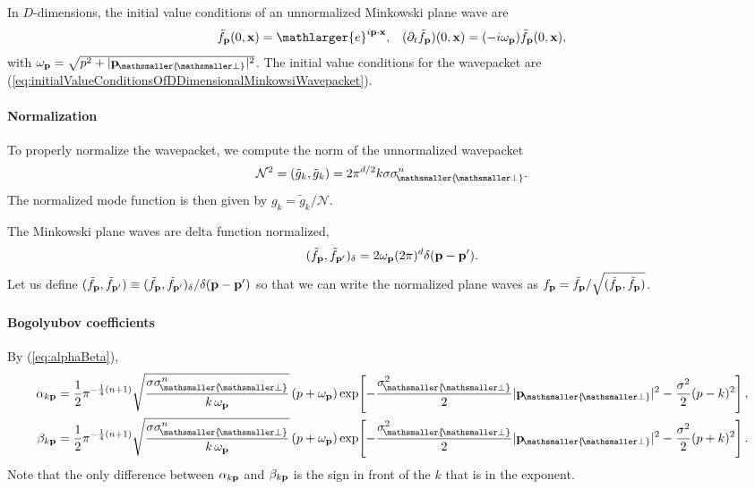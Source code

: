 \documentclass[11pt, a4paper]{article}
\def\bx{{\bf x}}
\def\bp{{\bf p}}
\newcommand{\om}{\omega}
\newcommand{\be}{\beta}
\newcommand{\al}{\alpha}
\newcommand{\si}{{\sigma}}
\newcommand{\mc}[1]{\mathcal{#1}}
\let\perptmp\perp
\renewcommand{\perp}{{\! \mathsmaller{\perptmp}}}
\newcommand{\e}{\mathlarger{e}}
\begin{document}
In $D$-dimensions, the initial value conditions of an unnormalized Minkowski plane wave are 
\begin{align*}
	\tilde f_\bp(0,\bx)=\e^{i \bp\cdot\bx},&&(\partial_t \tilde f_\bp)(0,\bx)=(-i\om_\bp)\tilde f_\bp(0,\bx),
\end{align*}
with $\om_\bp=\sqrt{p ^2+|\bp_\perp|^2}$. The initial value conditions for the wavepacket are (\ref{eq:initialValueConditionsOfDDimensionalMinkowsiWavepacket}).

\paragraph{Normalization}
To properly normalize the wavepacket, we compute the norm of the unnormalized wavepacket 
\begin{align*}
\mc N^2=(\tilde g_k,\tilde g_k)=2\pi^{d/2} k \si \si_\perp^n.
\end{align*}
The normalized mode function is then given by $g_k=\tilde g_k/
	\mc N$.

The Minkowski plane waves are delta function normalized, 
\begin{align*}
	(\tilde f_\bp,\tilde f_{\bp'})_\delta=2\om_\bp(2\pi)^{d}\delta(\bp-\bp'). 
\end{align*}
Let us define $(\tilde f_\bp,\tilde f_{\bp'})\equiv(\tilde f_\bp,\tilde f_{\bp'})_\delta/\delta(\bp-\bp')$ so that we can write the normalized plane waves as $f_\bp=\tilde f_\bp/\sqrt{(\tilde f_\bp,\tilde f_\bp)}$. 


\paragraph{Bogolyubov coefficients}
By (\ref{eq:alphaBeta}),
\begin{align*}
	\al_{k\bp}&=\frac{1}{2}\pi^{-\frac{1}{4}(n+1)}\sqrt{\frac{\si \si_\perp^n}{ k \,\om_\bp}}\,(p +\om_\bp)\exp\!\left[-\frac{\si_\perp^2}{2}|\bp_\perp|^2-\frac{\si ^2}{2}(p - k )^2\right],\\
	\be_{k\bp}&=\frac{1}{2}\pi^{-\frac{1}{4}(n+1)}\sqrt{\frac{\si \si_\perp^n}{ k \,\om_\bp}}\,(p +\om_\bp)\exp\!\left[-\frac{\si_\perp^2}{2}|\bp_\perp|^2-\frac{\si ^2}{2}(p + k )^2\right].
\end{align*}
Note that the only difference between $\al_{k\bp}$ and $\be_{k\bp}$ is the sign in front of the $ k $ that is in the exponent.
\end{document}
